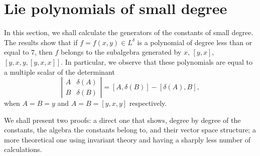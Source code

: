 \documentclass{cimart}
\begin{document}
\section{Lie polynomials of small degree}

In this section, we shall calculate the generators of the constants of small degree. The results show that if $f = f(x, y) \in L^{\delta}$  is a polynomial of degree less than or equal to $7$, then $f $ belongs to the subalgebra generated by $x$, $[y, x]$, $[y, x, y, [y, x, x]]$. In particular, we observe that these polynomials are equal to a multiple scalar of the determinant 
\[
\left|
\begin{array}{cc}
A & \delta(A)\\
B & \delta(B)	
\end{array}
\right|
=[A,\delta(B)]-[\delta(A),B],
\]
when $A = B = y$ and $A = B = [y, x, y]$ respectively.

We shall present two proofs: a direct one that shows, degree by degree of the constants, the algebra the constants belong to, and their vector space structure; a more theoretical one using invariant theory and having a sharply less number of calculations.


\end{document}
